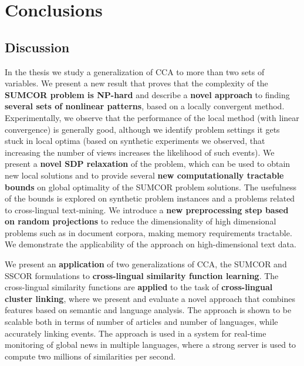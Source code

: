 %
\chapter{Conclusions}\label{chap:conclusions}

\section{Discussion}

In the thesis we study a generalization of CCA to more than two
sets of variables. We present a new result that proves that
the complexity of the \textbf{SUMCOR problem
is NP-hard} and describe a \textbf{novel approach} to finding \textbf{several sets
of nonlinear patterns}, based on a locally convergent method.
Experimentally, we observe that the
performance of the local method (with linear convergence) is
generally good, although we identify problem settings it gets
stuck in local optima (based on synthetic experiments we observed, 
that increasing the number of views increases the likelihood of such events).
We present a \textbf{novel SDP relaxation} of the problem, which can be used to obtain new
local solutions and to provide several \textbf{new computationally tractable bounds} on
global optimality of the SUMCOR problem solutions.
The usefulness of the bounds is explored on synthetic problem
instances and a problems related to cross-lingual text-mining.
We introduce a \textbf{new preprocessing step based on random
projections} to reduce the dimensionality of high dimensional problems
such as in document corpora, making memory requirements tractable.
We demonstrate the applicability of the approach on high-dimensional
text data.

We present an \textbf{application} of two generalizations of CCA, the
SUMCOR and SSCOR formulations to \textbf{cross-lingual similarity function
learning}. The cross-lingual similarity functions are \textbf{applied} to
the task of \textbf{cross-lingual cluster linking}, where we present and evaluate a novel
approach that combines features based on semantic and language analysis.
The approach is shown to be scalable both in
terms of number of articles and number of languages, while accurately linking events.
The approach is used in a system for real-time monitoring of global news in
multiple languages, where a strong server is used to compute two millions
of similarities per second.

